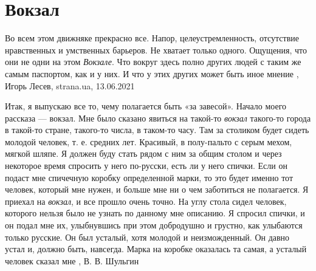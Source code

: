  
 
 
 
 
\chapter{Вокзал}
\label{sec:slova.vokzal}

Во всем этом движняке прекрасно все. Напор, целеустремленность, отсутствие
нравственных и умственных барьеров. Не хватает только одного. Ощущения, что они
не одни на этом \emph{Вокзале}. Что вокруг здесь полно других людей с таким же
самым паспортом, как и у них. И что у этих других может быть иное мнение
, 
Игорь Лесев, strana.ua, 13.06.2021

Итак, я выпускаю все то, чему полагается быть «за завесой». Начало моего
рассказа — вокзал. Мне было сказано явиться на такой-то \emph{вокзал} такого-то города
в такой-то стране, такого-то числа, в таком-то часу. Там за столиком будет
сидеть молодой человек, т. е. средних лет. Красивый, в полу-пальто с серым
мехом, мягкой шляпе. Я должен буду стать рядом с ним за общим столом и через
некоторое время спросить у него по-русски, есть ли у него спички. Если он
подаст мне спичечную коробку определенной марки, то это будет именно тот
человек, который мне нужен, и больше мне ни о чем заботиться не полагается.  Я
приехал на \emph{вокзал}, и все прошло очень точно. На углу стола сидел человек,
которого нельзя было не узнать по данному мне описанию. Я спросил спички, и он
подал мне их, улыбнувшись при этом добродушно и грустно, как улыбаются только
русские. Он был усталый, хотя молодой и неизможденный. Он давно устал и, должно
быть, навсегда.  Марка на коробке оказалась та самая, а усталый человек сказал
мне
, В. В. Шульгин
